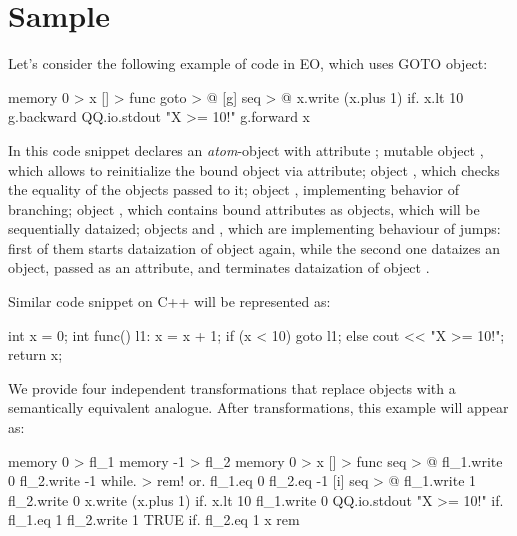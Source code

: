 \documentclass[sigplan,review,11pt,nonacm,natbib=false]{acmart}
\theoremstyle{theorems}
\begin{document}
    \section{Sample}
    Let's consider the following example of code in EO, which uses GOTO object:

    \begin{ffcode}
        memory 0 > x
        [] > func
        goto > @
        [g]
        seq > @
        x.write (x.plus 1)
        if.
        x.lt 10
        g.backward
        QQ.io.stdout "X >= 10!\n"
        g.forward x
    \end{ffcode}


    In this code snippet declares an \emph{atom}-object  with attribute ;
    mutable object , which allows to reinitialize the bound object  via  attribute;
    object , which checks the equality of the objects passed to it;
    object , implementing behavior of branching;
    object , which contains bound attributes as objects, which will be sequentially dataized;
    objects  and , which are implementing behaviour of jumps: first of them starts dataization of object  again, while the second one dataizes an object, passed as an attribute, and terminates dataization of object .

    Similar code snippet on C++ will be represented as:
    \begin{ffcode}
        int x = 0;
        int func() {
            l1:
            x = x + 1;
            if (x < 10)
            goto l1;
            else
            cout << "X >= 10!\n";
            return x;
        }
    \end{ffcode}

    We provide four independent transformations that replace  objects with a semantically equivalent analogue. After transformations, this example will appear as:
    \begin{ffcode}
        memory 0 > fl_1
        memory -1 > fl_2
        memory 0 > x
        [] > func
        seq > @
        fl_1.write 0
        fl_2.write -1
        while. > rem!
        or.
        fl_1.eq 0
        fl_2.eq -1
        [i]
        seq > @
        fl_1.write 1
        fl_2.write 0
        x.write (x.plus 1)
        if.
        x.lt 10
        fl_1.write 0
        QQ.io.stdout "X >= 10!\n"
        if.
        fl_1.eq 1
        fl_2.write 1
        TRUE
        if.
        fl_2.eq 1
        x
        rem
    \end{ffcode}
\end{document}
